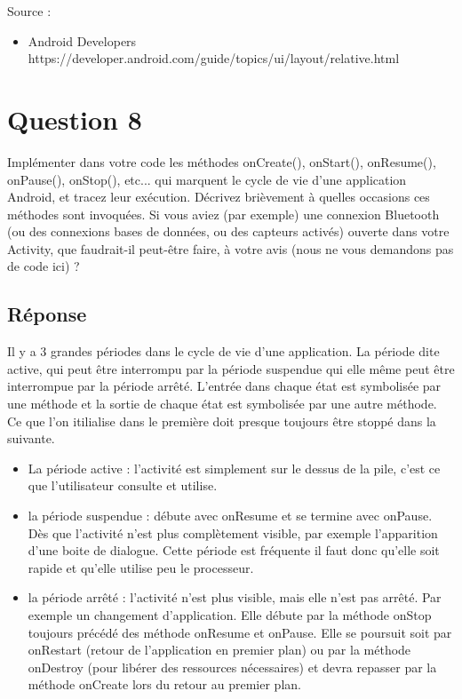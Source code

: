 \documentclass[francais,12pt]{article}
\begin{document}
		Source :
		\begin{itemize}
            \item Android Developers \newline
             https://developer.android.com/guide/topics/ui/layout/relative.html
        \end{itemize}
		
	\section*{Question 8}
		Implémenter dans votre code les méthodes onCreate(), onStart(), onResume(), onPause(), onStop(), etc... qui marquent le cycle de vie d'une application Android, et tracez leur exécution. Décrivez brièvement à quelles occasions ces méthodes sont invoquées. Si vous aviez (par exemple) une connexion Bluetooth (ou des connexions bases de données, ou des capteurs activés) ouverte dans votre Activity, que faudrait-il peut-être faire, à votre avis (nous ne vous demandons pas de code ici) ? 
		
		\subsection*{Réponse}
		Il y a 3 grandes périodes dans le cycle de vie d'une application. La période dite active, qui peut être interrompu par la période
		suspendue qui elle même peut être interrompue par la période arrêté.
		L'entrée dans chaque état est symbolisée par une méthode et la sortie de chaque état est symbolisée par une autre méthode. Ce que l'on itilialise dans le première doit presque toujours être stoppé dans la suivante.
		
		\begin{itemize}
			\item La période active : l'activité est simplement sur le dessus de la pile, c'est ce que l'utilisateur consulte et utilise. 
			\item la période suspendue : débute avec onResume et se termine avec onPause. Dès que l'activité n'est plus complètement visible, par exemple l'apparition d'une boite de dialogue. Cette période est fréquente il faut donc qu'elle soit rapide et qu'elle utilise peu le processeur.
			\item la période arrêté : l'activité n'est plus visible, mais elle n'est pas arrêté. Par exemple un changement d'application. Elle débute par la méthode onStop toujours précédé des méthode onResume et onPause. Elle se poursuit soit par onRestart (retour de l'application en premier plan) ou par la méthode onDestroy (pour libérer des ressources nécessaires) et devra repasser par la méthode onCreate lors du retour au premier plan.
		\end{itemize}
		
\end{document}

